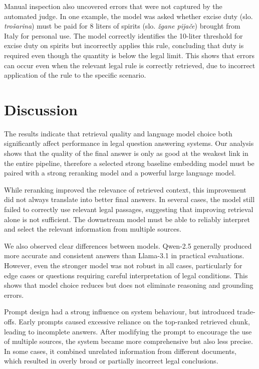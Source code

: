 \documentclass[fleqn,moreauthors,10pt]{ds_report}
\begin{document}
Manual inspection also uncovered errors that were not captured by the automated judge. In one example, the model was asked whether excise duty (slo. \emph{trošarina}) must be paid for 8 liters of spirits (slo. \emph{žgane pijače}) brought from Italy for personal use. The model correctly identifies the 10-liter threshold for excise duty on spirits but incorrectly applies this rule, concluding that duty is required even though the quantity is below the legal limit. This shows that errors can occur even when the relevant legal rule is correctly retrieved, due to incorrect application of the rule to the specific scenario.

\section*{Discussion}

The results indicate that retrieval quality and language model choice both significantly affect performance in legal question answering systems. Our analysis shows that the quality of the final answer is only as good at the weakest link in the entire pipeline, therefore a selected strong baseline embedding model must be paired with a strong reranking model and a powerful large language model.

While reranking improved the relevance of retrieved context, this improvement did not always translate into better final answers. In several cases, the model still failed to correctly use relevant legal passages, suggesting that improving retrieval alone is not sufficient. The downstream model must be able to reliably interpret and select the relevant information from multiple sources.

We also observed clear differences between models. Qwen-2.5 generally produced more accurate and consistent answers than Llama-3.1 in practical evaluations. However, even the stronger model was not robust in all cases, particularly for edge cases or questions requiring careful interpretation of legal conditions. This shows that model choice reduces but does not eliminate reasoning and grounding errors.

Prompt design had a strong influence on system behaviour, but introduced trade-offs. Early prompts caused excessive reliance on the top-ranked retrieved chunk, leading to incomplete answers. After modifying the prompt to encourage the use of multiple sources, the system became more comprehensive but also less precise. In some cases, it combined unrelated information from different documents, which resulted in overly broad or partially incorrect legal conclusions.
\end{document}

